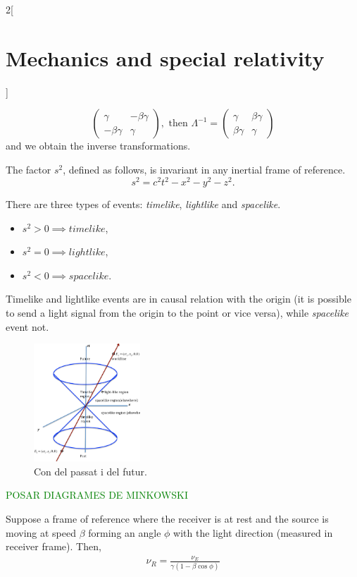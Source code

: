 \documentclass[class=article,10pt,crop=false]{standalone}
\begin{document}
\begin{multicols}{2}[\section{Mechanics and special relativity}]
\begin{concept}
$$\begin{pmatrix}
\gamma & -\beta\gamma\\
-\beta\gamma & \gamma
\end{pmatrix},\text{ then }\Lambda^{-1}=\begin{pmatrix}
\gamma & \beta\gamma\\
\beta\gamma & \gamma
\end{pmatrix}$$ and we obtain the inverse transformations.
\end{concept}
\begin{concept}
The factor $s^2$, defined as follows, is invariant in any inertial frame of reference. $$s^2=c^2t^2-x^2-y^2-z^2.$$
\end{concept}
\begin{concept}
There are three types of events: \textit{timelike}, \textit{lightlike} and \textit{spacelike}.
\begin{itemize}
    \item $s^2>0\implies timelike$,
    \item $s^2=0\implies lightlike$,
    \item $s^2<0\implies spacelike$.
\end{itemize}
Timelike and lightlike events are in causal relation with the origin (it is possible to send a light signal from the origin to the point or vice versa), while \textit{spacelike} event not.
\end{concept}
\begin{figure}[ht]
    \centering
    \includegraphics[width=4cm]{Physics/1st/Mechanics_and_special_relativity/Images/mink.png}
    \caption{Con del passat i del futur.}
\end{figure}
\textcolor{green}{POSAR DIAGRAMES DE MINKOWSKI}
\begin{concept}
Suppose a frame of reference where the receiver is at rest and the source is moving at speed $\beta$ forming an angle $\phi$ with the light direction (measured in receiver frame). Then, 
\begin{gather}
    \label{dopp1}\nu_R=\frac{\nu_E}{\gamma(1-\beta\cos\phi)}\\

\end{gather}
\end{concept}
\end{multicols}
\end{document}
